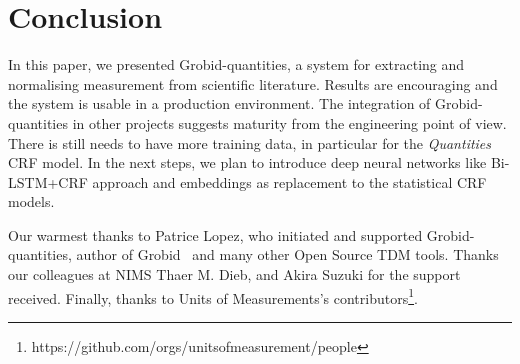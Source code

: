 \documentclass[sigconf]{acmart}
\begin{document}
\section{Conclusion}
\label{sec:conclusion}
In this paper, we presented Grobid-quantities, a system for extracting and normalising measurement from scientific literature. Results are encouraging and the system is usable in a production environment. The integration of Grobid-quantities in other projects suggests maturity from the engineering point of view. There is still needs to have more training data, in particular for the \textit{Quantities} CRF model. In the next steps, we plan to introduce deep neural networks like Bi-LSTM+CRF approach and embeddings as replacement to the statistical CRF models. 

\begin{acks}
Our warmest thanks to Patrice Lopez, who initiated and supported Grobid-quantities, author of Grobid~\cite{GROBID} and many other Open Source TDM tools. Thanks our colleagues at NIMS Thaer M. Dieb, and Akira Suzuki for the support received. Finally, thanks to Units of Measurements's contributors\footnote{https://github.com/orgs/unitsofmeasurement/people}.
\end{acks}




\end{document}
